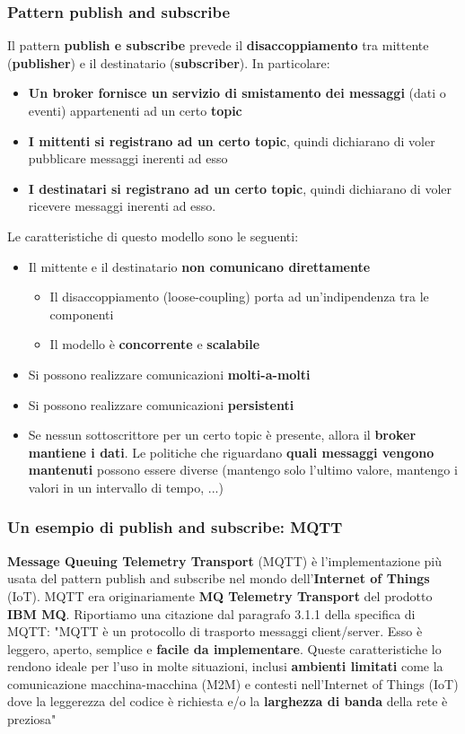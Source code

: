 \documentclass[12pt]{article}
\begin{document}
\subsubsection{Pattern publish and subscribe}
Il pattern \textbf{publish e subscribe} prevede il \textbf{disaccoppiamento} tra mittente (\textbf{publisher}) e il destinatario (\textbf{subscriber}). In particolare:
\begin{itemize}
    \item \textbf{Un broker fornisce un servizio di smistamento dei messaggi} (dati o eventi) appartenenti ad un certo \textbf{topic}
    \item \textbf{I mittenti si registrano ad un certo topic}, quindi dichiarano di voler pubblicare messaggi inerenti ad esso
    \item \textbf{I destinatari si registrano ad un certo topic}, quindi dichiarano di voler ricevere messaggi inerenti ad esso.
\end{itemize}
Le caratteristiche di questo modello sono le seguenti:
\begin{itemize}
    \item Il mittente e il destinatario \textbf{non comunicano direttamente}
          \begin{itemize}
              \item Il disaccoppiamento (loose-coupling) porta ad un'indipendenza tra le componenti
              \item Il modello è \textbf{concorrente} e \textbf{scalabile}
          \end{itemize}
    \item Si possono realizzare comunicazioni \textbf{molti-a-molti}
    \item Si possono realizzare comunicazioni \textbf{persistenti}
    \item Se nessun sottoscrittore per un certo topic è presente, allora il \textbf{broker mantiene i dati}. Le politiche che riguardano \textbf{quali messaggi vengono mantenuti} possono essere diverse (mantengo solo l’ultimo valore, mantengo i valori in un intervallo di tempo, ...)
\end{itemize}
\subsubsection{Un esempio di publish and subscribe: MQTT}
\textbf{Message Queuing Telemetry Transport} (MQTT) è l'implementazione più usata del pattern publish and subscribe nel mondo dell'\textbf{Internet of Things} (IoT). MQTT era originariamente \textbf{MQ Telemetry Transport} del prodotto \textbf{IBM MQ}. Riportiamo una citazione dal paragrafo 3.1.1 della specifica di MQTT: \newline
"MQTT è un protocollo di trasporto messaggi client/server. Esso è leggero, aperto, semplice e \textbf{facile da implementare}. Queste caratteristiche lo rendono ideale per l'uso in molte situazioni, inclusi \textbf{ambienti limitati} come la comunicazione macchina-macchina (M2M) e contesti nell'Internet of Things (IoT) dove la leggerezza del codice è richiesta e/o la \textbf{larghezza di banda} della rete è preziosa"
\end{document}

